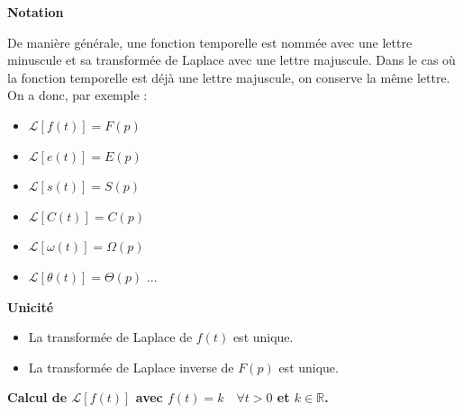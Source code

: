 \documentclass[11pt,oneside]{article}
\begin{document}
\begin{rem}
\textbf{Notation}

De manière générale, une fonction temporelle est nommée avec une lettre minuscule et sa transformée de Laplace avec une lettre majuscule. Dans le cas où la fonction temporelle est déjà une lettre majuscule, on conserve la même lettre. On a donc, par exemple : 
\begin{multicols}{2}
\begin{itemize}
\item $\mathcal{L}\left[f(t)\right] = F(p)$
\item $\mathcal{L}\left[e(t)\right] = E(p)$
\item $\mathcal{L}\left[s(t)\right] = S(p)$
\item $\mathcal{L}\left[C(t)\right] = C(p)$
\item $\mathcal{L}\left[\omega(t)\right] = \Omega(p)$
\item $\mathcal{L}\left[\theta(t)\right] = \Theta(p)$ ...
\end{itemize}
\end{multicols}
\end{rem}

\begin{prop}
\textbf{Unicité}

\begin{itemize}
\item La transformée de Laplace de $f(t)$ est unique.
\item La transformée de Laplace inverse de $F(p)$ est unique.
\end{itemize}

\end{prop}


\begin{exemple}
\textbf{Calcul de $\mathcal{L}\left[f(t) \right]$ avec $f(t)=k\quad \forall t> 0$ et $k\in \mathbb{R}$.}




\end{exemple}
\end{document}
